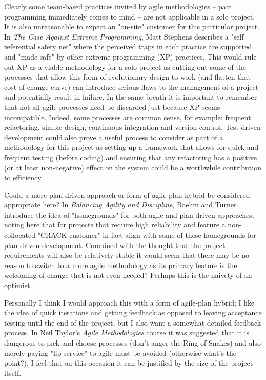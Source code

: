 Clearly some team-based practices invited by agile methodologies -- pair
programming immediately comes to mind -- are not applicable in a solo project.
It is also unreasonable to expect an "on-site" customer for this particular
project. In \textit{The Case Against Extreme Programming}, Matt Stephens
describes a "self referential safety net" where the perceived traps in each
practice are supported and "made safe" by other extreme programming (XP)
practices.  This would rule out XP as a viable methodology for a
solo project as cutting out some of the processes that allow this form of
evolutionary design to work (and flatten that cost-of-change curve) can
introduce serious flaws to the management of a project and potentially result in
failure. In the same breath it is important to remember that not all agile
processes need be discarded just because XP seems incompatible. Indeed, some
processes are common sense, for example: frequent refactoring, simple
design, continuous integration and version control. Test driven development
could also prove a useful process to consider as part of a methodology for this
project as setting up a framework that allows for quick and frequent testing
(before coding) and ensuring that any refactoring has a positive (or at least
non-negative) effect on the system could be a worthwhile contribution to
efficiency.

Could a more plan driven approach or form of agile-plan hybrid be considered
appropriate here? In \textit{Balancing Agility and Discipline}, Boehm
and Turner introduce the idea of "homegrounds" for both agile and plan driven
approaches; noting here that for projects that require high reliability and
feature a non-collocated "CRACK customer" in fact align with some of these
homegrounds for plan driven development. Combined with the thought that the
project requirements will also be relatively stable it would seem that there
may be no reason to switch to a more agile methodology as its primary feature
is the welcoming of change that is not even needed? Perhaps this is the naivety
of an optimist.

Personally I think I would approach this with a form of agile-plan hybrid; I
like the idea of quick iterations and getting feedback as opposed to leaving
acceptance testing until the end of the project, but I also want a somewhat
detailed feedback process. In Neil Taylor's \textit{Agile Methodologies} course
it was suggested that it is dangerous to pick and choose processes (don’t anger
the Ring of Snakes) and also merely paying "lip service" to agile must be
avoided (otherwise what's the point?), I feel that on this occasion it can be
justified by the size of the project itself.

